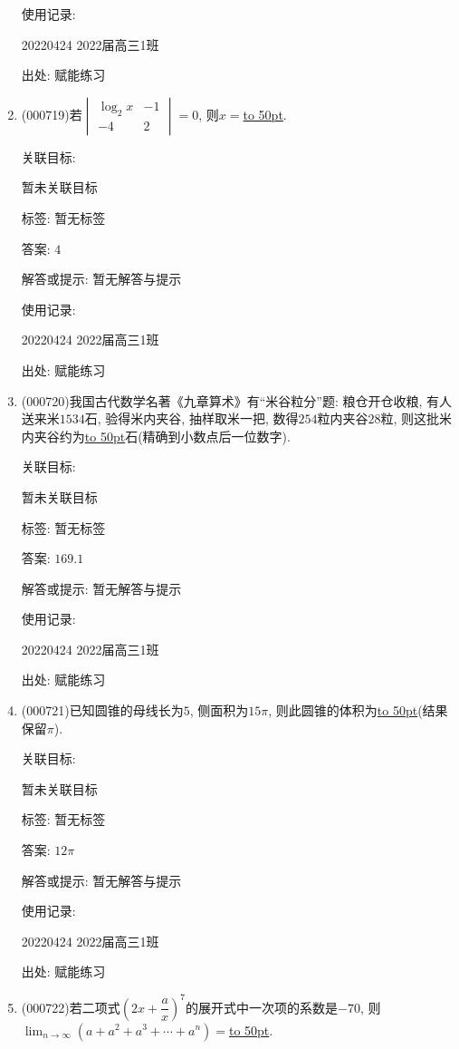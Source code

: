 \documentclass[10pt,a4paper]{article}
\newcommand{\blank}[1]{\underline{\hbox to #1pt{}}}
\begin{document}
\begin{enumerate}[1.]
使用记录:

20220424	2022届高三1班	


出处: 赋能练习
\item { (000719)}若$\begin{vmatrix} \log_2 x & -1  \\ -4 & 2  \end{vmatrix}=0$, 则$x=$\blank{50}.


关联目标:

暂未关联目标



标签: 暂无标签

答案: $4$

解答或提示: 暂无解答与提示

使用记录:

20220424	2022届高三1班	


出处: 赋能练习
\item { (000720)}我国古代数学名著《九章算术》有``米谷粒分''题: 粮仓开仓收粮, 有人送来米$1534$石, 验得米内夹谷, 抽样取米一把, 数得$254$粒内夹谷$28$粒, 则这批米内夹谷约为\blank{50}石(精确到小数点后一位数字).


关联目标:

暂未关联目标



标签: 暂无标签

答案: $169.1$

解答或提示: 暂无解答与提示

使用记录:

20220424	2022届高三1班	


出处: 赋能练习
\item { (000721)}已知圆锥的母线长为$5$, 侧面积为$15\pi$, 则此圆锥的体积为\blank{50}(结果保留$\pi$).


关联目标:

暂未关联目标



标签: 暂无标签

答案: $12\pi$

解答或提示: 暂无解答与提示

使用记录:

20220424	2022届高三1班	


出处: 赋能练习
\item { (000722)}若二项式$(2x+\dfrac ax)^7$的展开式中一次项的系数是$-70$, 则$\displaystyle\lim_{n\to\infty}(a+a^2+a^3+\cdots+a^n)=$\blank{50}.



\end{enumerate}
\end{document}
